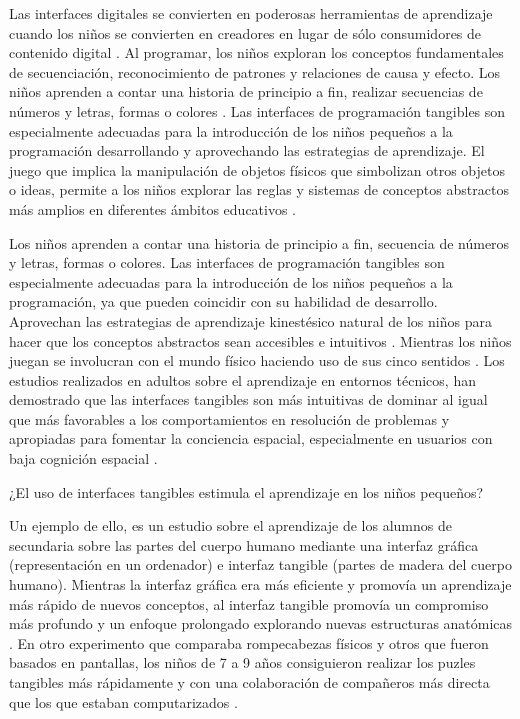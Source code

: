 Las interfaces digitales se convierten en poderosas herramientas de aprendizaje cuando los niños se convierten en creadores en lugar de sólo consumidores de contenido digital \cite{Resnick}. Al programar, los niños exploran los conceptos fundamentales de secuenciación, reconocimiento de patrones y relaciones de causa y efecto. Los niños aprenden a contar una historia de principio a fin, realizar secuencias de números y letras, formas o colores \cite{Kazakoff}.
Las interfaces de programación tangibles son especialmente adecuadas para la introducción de los niños pequeños a la programación desarrollando y aprovechando las estrategias de aprendizaje. El juego que implica la manipulación de objetos físicos que simbolizan otros objetos o ideas, permite a los niños explorar las reglas y sistemas de conceptos abstractos más amplios en diferentes ámbitos educativos \cite{Piaget}.

Los niños aprenden a contar una historia de principio a fin, secuencia de números y letras, formas o colores. Las interfaces de programación tangibles son especialmente adecuadas para la introducción de los niños pequeños a la programación, ya que pueden coincidir con su habilidad de desarrollo. Aprovechan las estrategias de aprendizaje kinestésico natural de los niños para hacer que los conceptos abstractos sean accesibles e intuitivos \cite{Xu}. Mientras los niños juegan se involucran con el mundo físico haciendo uso de sus cinco sentidos \cite{Vygotsky}.
Los estudios realizados en adultos sobre el aprendizaje en entornos técnicos, han demostrado que las interfaces tangibles son más intuitivas de dominar al igual que más favorables a los comportamientos en resolución de problemas y apropiadas para fomentar la conciencia espacial, especialmente en usuarios con baja cognición espacial \cite{Quarles} \cite{Kim}.

¿El uso de interfaces tangibles estimula el aprendizaje en los niños pequeños?

Un ejemplo de ello, es un estudio sobre el aprendizaje de los alumnos de secundaria sobre las partes del cuerpo humano mediante una interfaz gráfica (representación en un ordenador) e interfaz tangible (partes de madera del cuerpo humano). Mientras la interfaz gráfica era más eficiente y promovía un aprendizaje más rápido de nuevos conceptos, al interfaz tangible promovía un compromiso más profundo y un enfoque prolongado explorando nuevas estructuras anatómicas \cite{Ploderer}.
En otro experimento que comparaba rompecabezas físicos y otros que fueron basados en pantallas, los niños de 7 a 9 años consiguieron realizar los puzles tangibles más rápidamente y con una colaboración de compañeros más directa que los que estaban computarizados \cite{Xie}.

